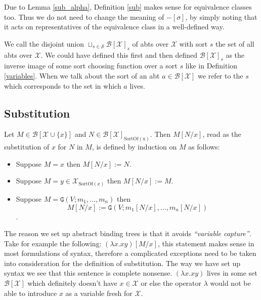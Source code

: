 \begin{remark}
    Due to Lemma \ref{sub_alpha}, Definition \ref{sub} makes sense for equivalence classes too. Thus we do not need to change the meaning of $-[\sigma]$, by simply noting that it acts on representatives of the equivalence class in a well-defined way.
\end{remark}

\begin{defin}
    We call the disjoint union $\sqcup_{s \in \mathcal{S}} \mathcal{B}[\mathcal{X}]_s$ of abts over $\mathcal{X}$ with sort $s$ the set of all abts over $\mathcal{X}$. We could have defined this first and then defined $\mathcal{B}[\mathcal{X}]_s$ as the inverse image of some sort choosing function over a sort $s$ like in Definition \ref{variables}. When we talk about the sort of an abt $a \in \mathcal{B}[\mathcal{X}]$ we refer to the $s$ which corresponds to the set in which $a$ lives. 
\end{defin}

\subsection{Substitution}

\begin{defin}\label{subst}
    Let $M \in \mathcal{B} [\mathcal{X} \cup \{ x \}]$ and $N \in \mathcal{B}[\mathcal{X}]_{\mathrm{SortOf(x)}}$. Then $M[N/x]$, read as the substitution of $x$ for $N$ in $M$, is defined by induction on $M$ as follows:
    \begin{itemize}
        \item Suppose $M = x$ then $M[N / x] := N$.
        \item Suppose $M = y \in \mathcal{X}_{\mathrm{SortOf}(x)}$ then $M[N / x] := M$.
        \item Suppose $M = \mathtt{G}(V; m_1 , \dots, m_n)$ then $$M[N / x] := \mathtt{G}(V; m_1[N / x], \dots, m_n[N / x])$$.
    \end{itemize}
\end{defin}

\begin{remark}
    The reason we set up abstract binding trees is that it avoids \emph{``variable capture''}. Take for example the following: $(\lambda x . x y)[M / x]$, this statement makes sense in most formulations of syntax, therefore a complicated exceptions need to be taken into consideration for the definition of substitution. The way we have set up syntax we see that this sentence is complete nonsense. $(\lambda x . x y)$ lives in some set $\mathcal{B}[\mathcal{X}]$ which definitely doesn't have $x \in \mathcal{X}$ or else the operator $\lambda$ would not be able to introduce $x$ as a variable fresh for $\mathcal{X}$.
\end{remark}

